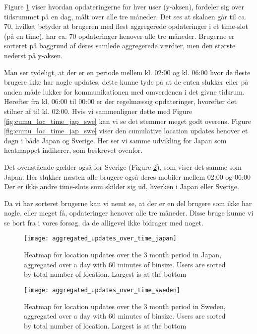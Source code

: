 Figure \ref{fig:agg_heatmap_jap} viser hvordan opdateringerne for hver user (y-aksen), fordeler sig over tidsrummet på en dag, målt over alle tre måneder. Det ses at skalaen går til ca. 70, hvilket betyder at brugeren med flest aggregerede opdateringer i et time-slot (på en time), har ca. 70 opdateringer henover alle tre måneder. Brugerne er sorteret på baggrund af deres samlede aggregerede værdier, men den største nederst på y-aksen. 

Man ser tydeligt, at der er en periode mellem kl. 02:00 og kl. 06:00 hvor de fleste brugere ikke har nogle updates, dette kunne tyde på at de enten slukker eller på anden måde lukker for kommunikationen med omverdenen i det givne tidsrum. Herefter fra kl. 06:00 til 00:00 er der regelmæssig opdateringer, hvorefter det stilner af til kl. 02:00. Hvis vi sammenligner dette med Figure \ref{fig:cumu_loc_time_jap_swe} kan vi se det stemmer meget godt overens. Figure \ref{fig:cumu_loc_time_jap_swe} viser den cumulative location updates henover et døgn i både Japan og Sverige. Her ser vi samme udvikling for Japan som heatmappet indikerer, som beskrevet ovenfor. 

Det ovenstående gælder også for Sverige (Figure \ref{fig:agg_heatmap_swe}), som viser det samme som Japan. Her slukker næsten alle brugere også deres mobiler mellem 02:00 og 06:00
Der er ikke andre time-slots som skilder sig ud, hverken i Japan eller Sverige. 

Da vi har sorteret brugerne kan vi nemt se, at der er en del brugere som ikke har nogle, eller meget få, opdateringer henover alle tre måneder. Disse bruge kunne vi se bort fra i vores forsøg, da de alligevel ikke bidrager med noget. 

\begin{figure}[H]
    \hspace*{-0.8cm}
    \centering
    \texttt{[image: aggregated\_updates\_over\_time\_japan]}
    \caption{Heatmap for location updates over the 3 month period in Japan, aggregated over a day with 60 minutes of binsize. Users are sorted by total number of location. Largest is at the bottom}
    \label{fig:agg_heatmap_jap}
\end{figure}
\begin{figure}[H]
    \hspace*{-0.8cm}
    \centering
    \texttt{[image: aggregated\_updates\_over\_time\_sweden]}
    \caption{Heatmap for location updates over the 3 month period in Sweden, aggregated over a day with 60 minutes of binsize. Users are sorted by total number of location. Largest is at the bottom}
    \label{fig:agg_heatmap_swe}
\end{figure}


